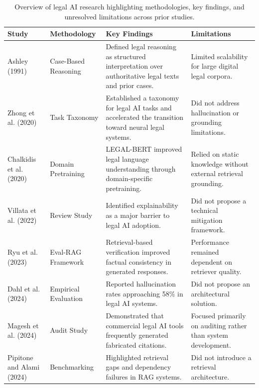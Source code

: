 \begin{table}[t]
\caption{Overview of legal AI research highlighting methodologies, key findings, and unresolved limitations across prior studies.}
\label{tab:litreview}
\centering
\footnotesize
\begin{tabularx}{\textwidth}{|>{\raggedright\arraybackslash}p{2.5cm}|>{\raggedright\arraybackslash}p{3.0cm}|>{\raggedright\arraybackslash}X|>{\raggedright\arraybackslash}X|}
\hline
\rowcolor{black!15}
\textbf{Study} & \textbf{Methodology} & \textbf{Key Findings} & \textbf{Limitations} \\
\hline

Ashley (1991) & Case-Based Reasoning & Defined legal reasoning as structured interpretation over authoritative legal texts and prior cases. & Limited scalability for large digital legal corpora. \\
\hline

Zhong et al. (2020) & Task Taxonomy & Established a taxonomy for legal AI tasks and accelerated the transition toward neural legal systems. & Did not address hallucination or grounding limitations. \\
\hline

Chalkidis et al. (2020) & Domain Pretraining & LEGAL-BERT improved legal language understanding through domain-specific pretraining. & Relied on static knowledge without external retrieval grounding. \\
\hline

Villata et al. (2022) & Review Study & Identified explainability as a major barrier to legal AI adoption. & Did not propose a technical mitigation framework. \\
\hline

Ryu et al. (2023) & Eval-RAG Framework & Retrieval-based verification improved factual consistency in generated responses. & Performance remained dependent on retriever quality. \\
\hline

Dahl et al. (2024) & Empirical Evaluation & Reported hallucination rates approaching 58\% in legal AI systems. & Did not propose an architectural solution. \\
\hline

Magesh et al. (2024) & Audit Study & Demonstrated that commercial legal AI tools frequently generated fabricated citations. & Focused primarily on auditing rather than system development. \\
\hline

Pipitone and Alami (2024) & Benchmarking & Highlighted retrieval gaps and dependency failures in RAG systems. & Did not introduce a retrieval architecture. \\
\hline


\end{tabularx}
\end{table}
